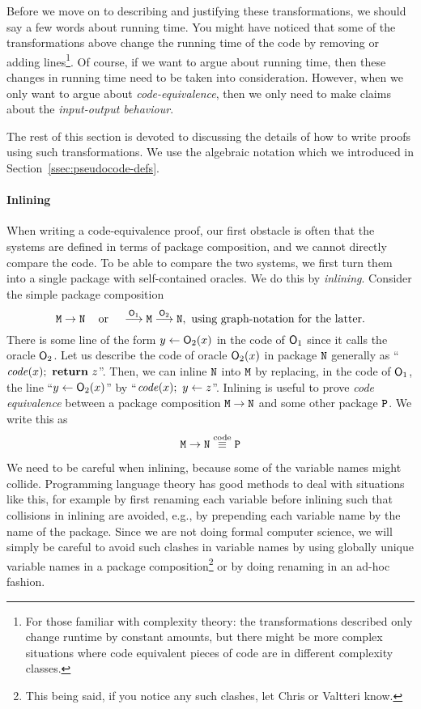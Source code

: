 Before we move on to describing and justifying these transformations, we should say a few words about running time. You might have noticed that some of the transformations above change the running time of the code by removing or adding lines\footnote{For those familiar with complexity theory: the transformations described only change runtime by constant amounts, but there might be more complex situations where code equivalent pieces of code are in different complexity classes.}. Of course, if we want to argue about running time, then these changes in running time need to be taken into consideration. However, when we only want to argue about \emph{code-equivalence}, then we only need to make claims about the \emph{input-output behaviour}.

The rest of this section is devoted to discussing the details of how to write proofs using such transformations. We use the algebraic notation which we introduced in Section~\ref{ssec:pseudocode-defs}.

\paragraph{Inlining} 
When writing a code-equivalence proof, our first obstacle is often that the systems are defined in terms of package composition, and we cannot directly compare the code. To be able to compare the two systems, we first turn them into a single package with self-contained oracles. We do this by \emph{inlining}.
Consider the simple package composition
\[\text{\texttt{M}}\rightarrow\text{\texttt{N}}\;\;\;\text{ or }\;\;\;\stackrel{\mathsf{O}_1}{\longrightarrow}\text{\texttt{M}}\stackrel{\mathsf{O}_2}{\longrightarrow}\text{\texttt{N}},\text{ 
using graph-notation for the latter.}\]
There is some line of the form $y\gets\mathsf{O}_2(x)$ in the code of $\mathsf{O}_1$ since it calls the oracle $\mathsf{O}_2$.
Let us describe the code of oracle $\mathsf{O}_2(x)$ in package $\text{\texttt{N}}$ generally as ``$\mathit{code}(x);\ \mathbf{return}\  z$''. Then, we can inline $\text{\texttt{N}}$ into $\text{\texttt{M}}$ by replacing, in the code of $\mathsf{O}_1$, the line ``$y\gets\mathsf{O}_2(x)$'' by ``$\mathit{code}(x);\ y\gets z$''. Inlining is useful to prove \emph{code equivalence} between a package composition $\text{\texttt{M}}\rightarrow\text{\texttt{N}}$ and some other package $\text{\texttt{P}}$. We write this as
\[\text{\texttt{M}}\rightarrow\text{\texttt{N}}\stackrel{\text{code}}{\equiv}\text{\texttt{P}}\]

We need to be careful when inlining, because some of the variable names might collide. Programming language theory has good methods to deal with situations like this, for example by first renaming each variable before inlining such that collisions in inlining are avoided, e.g., by 
 prepending each variable name by the name of the package. Since we are not doing formal computer science, we will simply be careful to avoid such clashes in variable names by using globally unique variable names in a package composition\footnote{This being said, if you notice any such clashes, let Chris or Valtteri know.} or by doing renaming in an ad-hoc fashion.

